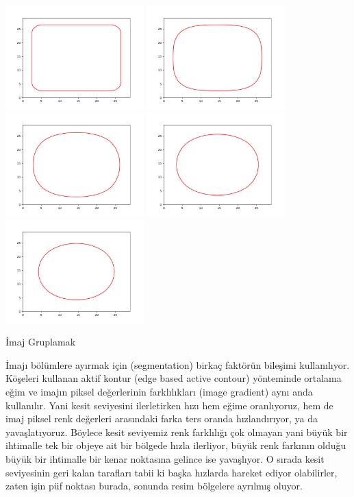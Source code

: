 \documentclass[12pt,fleqn]{article}\usepackage{../../common}
\begin{document}
\includegraphics[height=4cm]{img1/level_1_0.png}
\includegraphics[height=4cm]{img1/level_1_10.png}
\includegraphics[height=4cm]{img1/level_1_20.png}
\includegraphics[height=4cm]{img1/level_1_30.png}
\includegraphics[height=4cm]{img1/level_1_40.png}

İmaj Gruplamak

İmajı bölümlere ayırmak için (segmentation) birkaç faktörün bileşimi
kullanılıyor. Köşeleri kullanan aktif kontur (edge based active contour)
yönteminde ortalama eğim ve imajın piksel değerlerinin farklılıkları (image
gradient) aynı anda kullanılır. Yani kesit seviyesini ilerletirken hızı hem
eğime oranlıyoruz, hem de imaj piksel renk değerleri arasındaki farka ters
oranda hızlandırıyor, ya da yavaşlatıyoruz. Böylece kesit seviyemiz renk
farklılığı çok olmayan yani büyük bir ihtimalle tek bir objeye ait bir
bölgede hızla ilerliyor, büyük renk farkının olduğu büyük bir ihtimalle bir
kenar noktasına gelince ise yavaşlıyor. O sırada kesit seviyesinin geri
kalan tarafları tabii ki başka hızlarda hareket ediyor olabilirler, zaten
işin püf noktası burada, sonunda resim bölgelere ayrılmış oluyor.
\end{document}
